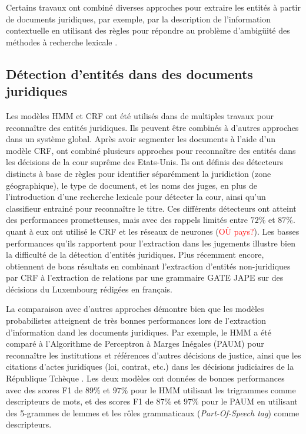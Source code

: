 Certains travaux ont combiné diverses approches pour extraire les entités à partir de documents juridiques,  par exemple,  par la description de l'information contextuelle en utilisant des règles pour répondre au problème d'ambigüité des méthodes à recherche lexicale \citep{mikheev1999NERlexicalWithRules,hanisch2005prominer}. 

\subsection{Détection d'entités dans des documents juridiques}

Les modèles HMM et CRF ont été utilisés dans de multiples travaux pour reconnaître des entités juridiques. Ils peuvent être combinés à d'autres approches dans un système global. Après avoir segmenter les documents à l'aide d'un modèle CRF, \citet{dozier2010legalnerr} ont combiné plusieurs approches pour reconnaître des entités dans les décisions de la cour suprême des Etats-Unis. Ils ont définis des détecteurs distincts à base de règles pour identifier séparémment la juridiction (zone géographique), le type de document, et les noms des juges, en plus de l'introduction d'une recherche lexicale pour détecter la cour, ainsi qu'un classifieur entrainé pour reconnaître le titre. Ces différents détecteurs ont atteint des performances prometteuses, mais avec des rappels limités entre $ 72 \% $ et $ 87 \% $. \citep{cardellino2017legalNERCL} quant à eux ont utilisé le CRF et les réseaux de neurones (\textcolor{red}{OÙ pays?}). Les basses performances qu'ils rapportent pour l'extraction dans les jugements illustre bien la difficulté de la détection d'entités juridiques. Plus récemment encore, \citet{andrew2018legalNerAndRelation} obtiennent de bons résultats en combinant l'extraction d'entités non-juridiques par CRF à l'extraction de relations par une grammaire GATE JAPE \citep{thakker2009gatejape} sur des décisions du Luxembourg rédigées en français.

La comparaison avec d'autres approches démontre bien que les modèles probabilistes atteignent de très bonnes performances lors de l'extraction d'information dand les documents juridiques. Par exemple, le HMM a été comparé à l'Algorithme de Perceptron à Marges Inégales (PAUM) \citep{li2002PAUM} pour reconnaître les institutions et références d'autres décisions de justice, ainsi que les citations d'actes juridiques (loi, contrat, etc.) dans les décisions judiciaires de la République Tchèque \citep{Kriz2014nerinczechdecisions}. Les deux modèles ont données de bonnes performances avec des scores F1 de $ 89 \% $ et $ 97 \% $ pour le HMM utilisant les trigrammes comme descripteurs de mots, et des scores F1 de $ 87 \% $ et $ 97 \% $ pour le PAUM en utilisant des 5-grammes de lemmes et les rôles grammaticaux (\textit{Part-Of-Speech tag}) comme descripteurs. 

